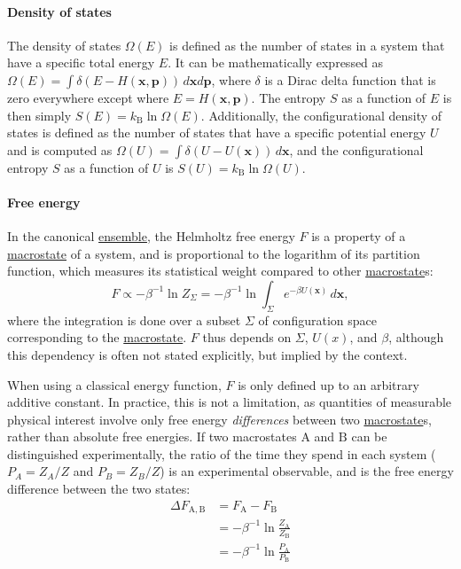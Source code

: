 \documentclass[9pt,review]{livecoms}
\newcommand{\vx}{\mathbf{x}}
\newcommand{\vp}{\mathbf{p}}
\newcommand{\A}{\mathrm{A}}
\newcommand{\B}{\mathrm{B}}
\begin{document}
\hypertarget{ref:density_of_states}{\paragraph{Density of states}}
The density of states $\Omega(E)$ is defined as the number of states in a system that have a specific total energy $E$.  It can be mathematically expressed as $\Omega(E) = \int \delta(E-H(\vx,\vp))\, d\vx d\vp$, where $\delta$ is a Dirac delta function that is zero everywhere except where $E=H(\vx,\vp)$. The entropy $S$ as a function of $E$ is then simply $S(E)=k_\mathrm{B} \ln \Omega(E)$. Additionally, the configurational density of states is defined as the number of states that have a specific potential energy $U$ and is computed as $\Omega(U) = \int \delta(U-U(\vx))\, d\vx$, and the configurational entropy $S$ as a function of $U$ is $S(U)=k_\mathrm{B} \ln \Omega(U)$.

\hypertarget{ref:FE} {\paragraph{Free energy}}
In the canonical \hyperlink{ref:Ensemble} {ensemble}, the Helmholtz free energy $F$ is a property of a \hyperlink{ref:Macrostate} {macrostate} of a system, and is proportional to the logarithm of its partition function, which measures its statistical weight compared to other \hyperlink{ref:Macrostate} {macrostate}s:
\begin{equation}
F \propto -\beta^{-1} \ln Z_{\Sigma} = -\beta^{-1} \ln \int_\Sigma e^{-\beta U(\vx)} \, d\vx,
\end{equation}
where the integration is done over a subset $\Sigma$ of configuration space corresponding to the \hyperlink{ref:Macrostate} {macrostate}. $F$ thus depends on $\Sigma$, $U(x)$, and $\beta$, although this dependency is often not stated explicitly, but implied by the context.

When using a classical energy function, $F$ is only defined up to an arbitrary additive constant.
In practice, this is not a limitation, as quantities of measurable physical interest involve only free energy \textit{differences} between two \hyperlink{ref:Macrostate} {macrostate}s, rather than absolute free energies.
If two macrostates $\A$ and $\B$ can be distinguished experimentally, the ratio of the time they spend in each system ($P_A = Z_A/Z$ and $P_B = Z_B/Z$) is an experimental observable, and is the free energy difference between the two states:
\begin{align}
  \Delta F_{\A,\B} &= F_{\A} - F_{\B} \nonumber\\
    & = -\beta^{-1} \ln \frac{Z_{\A}}{Z_{\B}} \nonumber\\
  & = -\beta^{-1} \ln \frac{P_{\A}}{P_{\B}}
\end{align}
\end{document}

